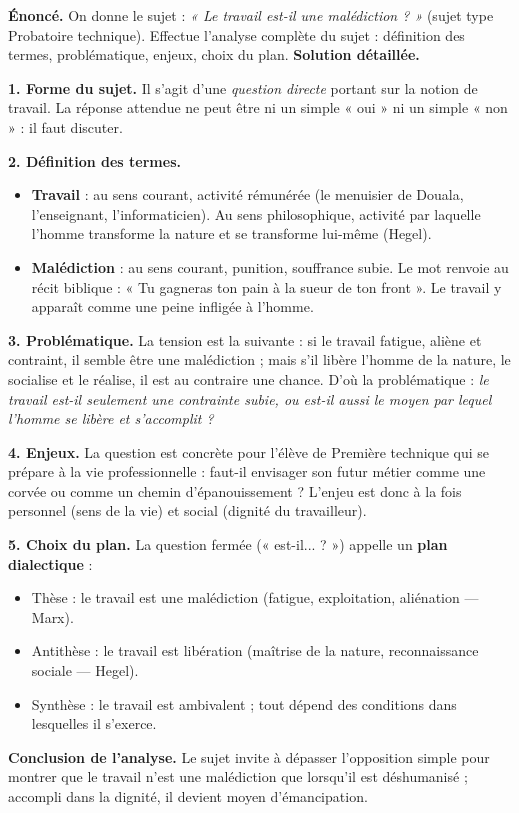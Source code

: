 \documentclass[11pt]{article}
\begin{document}
\begin{exoresolu}
\textbf{Énoncé.} On donne le sujet : \emph{« Le travail est-il une malédiction ? »} (sujet type Probatoire technique). Effectue l'analyse complète du sujet : définition des termes, problématique, enjeux, choix du plan.
\tcblower
\textbf{Solution détaillée.}

\textbf{1. Forme du sujet.} Il s'agit d'une \emph{question directe} portant sur la notion de travail. La réponse attendue ne peut être ni un simple « oui » ni un simple « non » : il faut discuter.

\textbf{2. Définition des termes.}
\begin{itemize}
\item \textbf{Travail} : au sens courant, activité rémunérée (le menuisier de Douala, l'enseignant, l'informaticien). Au sens philosophique, activité par laquelle l'homme transforme la nature et se transforme lui-même (Hegel).
\item \textbf{Malédiction} : au sens courant, punition, souffrance subie. Le mot renvoie au récit biblique : « Tu gagneras ton pain à la sueur de ton front ». Le travail y apparaît comme une peine infligée à l'homme.
\end{itemize}

\textbf{3. Problématique.} La tension est la suivante : si le travail fatigue, aliène et contraint, il semble être une malédiction ; mais s'il libère l'homme de la nature, le socialise et le réalise, il est au contraire une chance. D'où la problématique : \emph{le travail est-il seulement une contrainte subie, ou est-il aussi le moyen par lequel l'homme se libère et s'accomplit ?}

\textbf{4. Enjeux.} La question est concrète pour l'élève de Première technique qui se prépare à la vie professionnelle : faut-il envisager son futur métier comme une corvée ou comme un chemin d'épanouissement ? L'enjeu est donc à la fois personnel (sens de la vie) et social (dignité du travailleur).

\textbf{5. Choix du plan.} La question fermée (« est-il... ? ») appelle un \textbf{plan dialectique} :
\begin{itemize}
\item Thèse : le travail est une malédiction (fatigue, exploitation, aliénation — Marx).
\item Antithèse : le travail est libération (maîtrise de la nature, reconnaissance sociale — Hegel).
\item Synthèse : le travail est ambivalent ; tout dépend des conditions dans lesquelles il s'exerce.
\end{itemize}

\textbf{Conclusion de l'analyse.} Le sujet invite à dépasser l'opposition simple pour montrer que le travail n'est une malédiction que lorsqu'il est déshumanisé ; accompli dans la dignité, il devient moyen d'émancipation.
\end{exoresolu}
\end{document}
